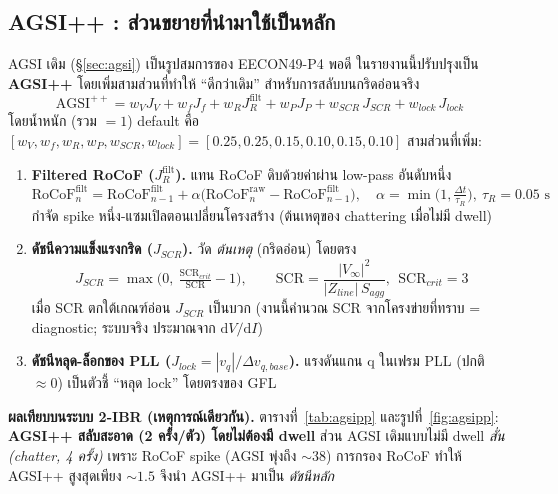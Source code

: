 \documentclass[12pt,a4paper]{article}
\begin{document}
\subsection{AGSI++ : ส่วนขยายที่นำมาใช้เป็นหลัก}
\label{sec:agsipp}
AGSI เดิม (\S\ref{sec:agsi}) เป็นรูปสมการของ EECON49-P4 พอดี ในรายงานนี้ปรับปรุงเป็น \textbf{AGSI++}
โดยเพิ่มสามส่วนที่ทำให้ ``ดีกว่าเดิม'' สำหรับการสลับบนกริดอ่อนจริง
\begin{equation}
\mathrm{AGSI}^{++} = w_V J_V + w_f J_f + w_R J_R^{\text{filt}} + w_P J_P
   + w_{SCR}\,J_{SCR} + w_{lock}\,J_{lock}
\label{eq:agsipp}
\end{equation}
โดยน้ำหนัก (รวม $=1$) default คือ $[w_V,w_f,w_R,w_P,w_{SCR},w_{lock}]=[0.25,0.25,0.15,0.10,0.15,0.10]$
สามส่วนที่เพิ่ม:
\begin{enumerate}
\item \textbf{Filtered RoCoF ($J_R^{\text{filt}}$).} แทน RoCoF ดิบด้วยค่าผ่าน low-pass อันดับหนึ่ง
\begin{equation}
\mathrm{RoCoF}^{\text{filt}}_{n}=\mathrm{RoCoF}^{\text{filt}}_{n-1}
  +\alpha\big(\mathrm{RoCoF}^{\text{raw}}_{n}-\mathrm{RoCoF}^{\text{filt}}_{n-1}\big),
\quad \alpha=\min\!\Big(1,\tfrac{\Delta t}{\tau_R}\Big),\ \tau_R=0.05\text{ s}
\label{eq:rocoffilt}
\end{equation}
กำจัด spike หนึ่ง-แซมเปิลตอนเปลี่ยนโครงสร้าง (ต้นเหตุของ chattering เมื่อไม่มี dwell)
\item \textbf{ดัชนีความแข็งแรงกริด ($J_{SCR}$).} วัด \emph{ต้นเหตุ} (กริดอ่อน) โดยตรง
\begin{equation}
J_{SCR}=\max\!\Big(0,\ \tfrac{\mathrm{SCR}_{crit}}{\mathrm{SCR}}-1\Big),\qquad
\mathrm{SCR}=\frac{|V_\infty|^2}{|Z_{line}|\,S_{agg}},\ \ \mathrm{SCR}_{crit}=3
\label{eq:jscr}
\end{equation}
เมื่อ SCR ตกใต้เกณฑ์อ่อน $J_{SCR}$ เป็นบวก (งานนี้คำนวณ SCR จากโครงข่ายที่ทราบ = diagnostic; ระบบจริง
ประมาณจาก $\mathrm{d}V/\mathrm{d}I$)
\item \textbf{ดัชนีหลุด-ล็อกของ PLL ($J_{lock}=|v_q|/\Delta v_{q,base}$).} แรงดันแกน q ในเฟรม PLL (ปกติ
$\approx0$) เป็นตัวชี้ ``หลุด lock'' โดยตรงของ GFL
\end{enumerate}

\textbf{ผลเทียบบนระบบ 2-IBR (เหตุการณ์เดียวกัน).} ตารางที่~\ref{tab:agsipp} และรูปที่~\ref{fig:agsipp}:
\textbf{AGSI++ สลับสะอาด (2 ครั้ง/ตัว) โดยไม่ต้องมี dwell} ส่วน AGSI เดิมแบบไม่มี dwell \emph{สั่น (chatter,
4 ครั้ง)} เพราะ RoCoF spike (AGSI พุ่งถึง $\sim38$) การกรอง RoCoF ทำให้ AGSI++ สูงสุดเพียง $\sim1.5$ จึงนำ
AGSI++ มาเป็น \emph{ดัชนีหลัก}
\end{document}
